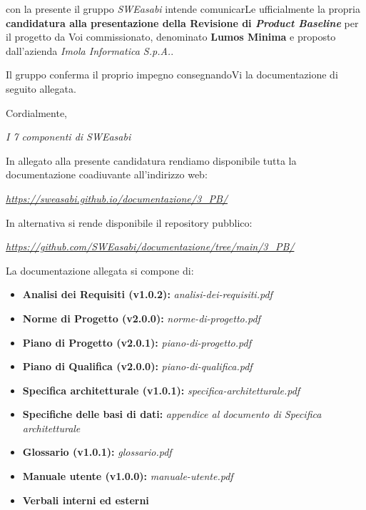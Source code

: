 \documentclass{article}
\begin{document}
con la presente il gruppo \textit{SWEasabi} intende comunicarLe ufficialmente la propria \textbf{candidatura alla presentazione della Revisione di \textit{Product Baseline}} per il progetto da Voi commissionato, denominato \textbf{Lumos Minima} e proposto dall'azienda \textit{Imola Informatica S.p.A.}.

Il gruppo conferma il proprio impegno consegnandoVi la documentazione di seguito allegata.

Cordialmente,

\begin{flushright}
\textit{I 7 componenti di SWEasabi}
\end{flushright}

In allegato alla presente candidatura rendiamo disponibile tutta la documentazione coadiuvante all'indirizzo web:

\begin{center}
    \href{https://sweasabi.github.io/documentazione/3\_PB/}{\textit{https://sweasabi.github.io/documentazione/3\_PB/}}
\end{center}

In alternativa si rende disponibile il repository pubblico:

\begin{center}
    \href{https://github.com/SWEasabi/documentazione/tree/main/3\_PB/}{\textit{https://github.com/SWEasabi/documentazione/tree/main/3\_PB/}}

\end{center}

La documentazione allegata si compone di:
\begin{itemize}
    \item \textbf{Analisi dei Requisiti (v1.0.2):} \textit{analisi-dei-requisiti.pdf}
    \item \textbf{Norme di Progetto (v2.0.0):} \textit{norme-di-progetto.pdf}
    \item \textbf{Piano di Progetto (v2.0.1):} \textit{piano-di-progetto.pdf}
    \item \textbf{Piano di Qualifica (v2.0.0):} \textit{piano-di-qualifica.pdf}
    \item \textbf{Specifica architetturale (v1.0.1):} \textit{specifica-architetturale.pdf}
    \item \textbf{Specifiche delle basi di dati:} \textit{appendice al documento di Specifica architetturale}
    \item \textbf{Glossario (v1.0.1):} \textit{glossario.pdf}
    \item \textbf{Manuale utente (v1.0.0):} \textit{manuale-utente.pdf}
    \item \textbf{Verbali interni ed esterni}
\end{itemize}
\end{document}
